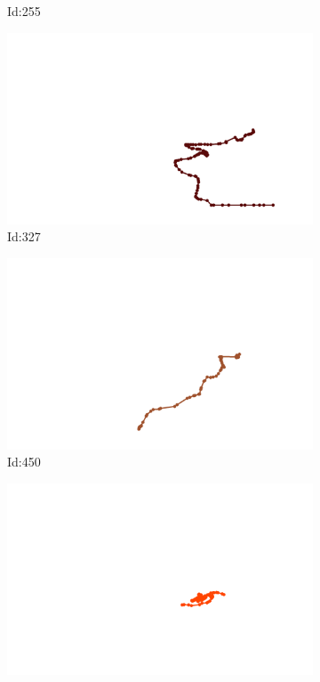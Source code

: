 \documentclass[12pt,twoside]{report}
\begin{document}
\begin{figure}
\begin{subfigure}[b]{0.20\textwidth}
\caption{Id:255}
\end{subfigure}
\begin{subfigure}[b]{0.20\textwidth}
\centering
\includegraphics[width=\textwidth]{../trajectories/327.png}
\caption{Id:327}
\end{subfigure}
\begin{subfigure}[b]{0.20\textwidth}
\centering
\includegraphics[width=\textwidth]{../trajectories/450.png}
\caption{Id:450}
\end{subfigure}
\begin{subfigure}[b]{0.20\textwidth}
\centering
\includegraphics[width=\textwidth]{../trajectories/461.png}

\end{subfigure}
\end{figure}
\end{document}
